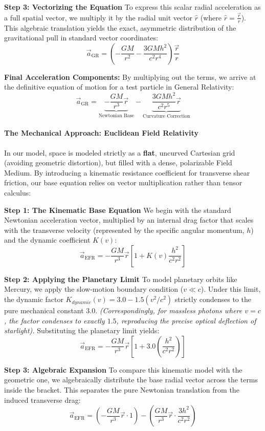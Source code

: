 \documentclass[
]{article}
\begin{document}
\textbf{Step 3: Vectorizing the Equation} To express this scalar radial
acceleration as a full spatial vector, we multiply it by the radial unit
vector \(\hat{r}\) (where \(\hat{r} = \frac{\vec{r}}{r}\)). This
algebraic translation yields the exact, asymmetric distribution of the
gravitational pull in standard vector coordinates:
\[\vec{a}_{\text{GR}} = \left( -\frac{GM}{r^2} - \frac{3GMh^2}{c^2r^4} \right) \frac{\vec{r}}{r}\]

\textbf{Final Acceleration Components:} By multiplying out the terms, we
arrive at the definitive equation of motion for a test particle in
General Relativity:
\[\vec{a}_{\text{GR}} = \underbrace{-\frac{GM}{r^3}\vec{r}}_{\text{Newtonian Base}} - \underbrace{\frac{3GMh^2}{c^2 r^5}\vec{r}}_{\text{Curvature Correction}}\]

\paragraph{The Mechanical Approach: Euclidean Field
Relativity}\label{the-mechanical-approach-euclidean-field-relativity}

In our model, space is modeled strictly as a \textbf{flat}, uncurved
Cartesian grid (avoiding geometric distortion), but filled with a dense,
polarizable Field Medium. By introducing a kinematic resistance
coefficient for transverse shear friction, our base equation relies on
vector multiplication rather than tensor calculus:

\textbf{Step 1: The Kinematic Base Equation} We begin with the standard
Newtonian acceleration vector, multiplied by an internal drag factor
that scales with the transverse velocity (represented by the specific
angular momentum, \(h\)) and the dynamic coefficient \(K(v)\):
\[\vec{a}_{\text{EFR}} = -\frac{GM}{r^3}\vec{r} \left[ 1 + K(v) \frac{h^2}{c^2 r^2} \right]\]

\textbf{Step 2: Applying the Planetary Limit} To model planetary orbits
like Mercury, we apply the slow-motion boundary condition (\(v \ll c\)).
Under this limit, the dynamic factor
\(K_{dynamic}(v) = 3.0 - 1.5(v^2/c^2)\) strictly condenses to the pure
mechanical constant \(3.0\). \emph{(Correspondingly, for massless
photons where \(v = c\), the factor condenses to exactly \(1.5\),
reproducing the precise optical deflection of starlight).} Substituting
the planetary limit yields:
\[\vec{a}_{\text{EFR}} = -\frac{GM}{r^3}\vec{r} \left[ 1 + 3.0 \left(\frac{h^2}{c^2 r^2}\right) \right]\]

\textbf{Step 3: Algebraic Expansion} To compare this kinematic model
with the geometric one, we algebraically distribute the base radial
vector across the terms inside the bracket. This separates the pure
Newtonian translation from the induced transverse drag:
\[\vec{a}_{\text{EFR}} = \left( -\frac{GM}{r^3}\vec{r} \cdot 1 \right) - \left( \frac{GM}{r^3}\vec{r} \cdot \frac{3h^2}{c^2 r^2} \right)\]
\end{document}
